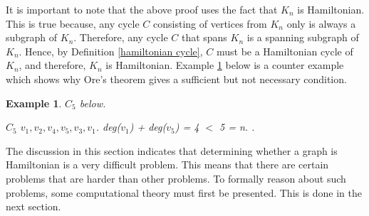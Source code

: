 \documentclass[12pt]{article}
\newtheorem{example}[definition]{Example}
\numberwithin{equation}{subsection}
\numberwithin{table}{subsection}
\numberwithin{algorithm}{subsection}
\begin{document}
It is important to note that the above proof uses the fact that $K_n$ is Hamiltonian. This is true because, any cycle $C$ consisting of vertices from $K_n$ only is always a subgraph of $K_n$. Therefore, any cycle $C$ that spans $K_n$ is a spanning subgraph of $K_n$. Hence, by Definition \ref{hamiltonian cycle}, $C$ must be a Hamiltonian cycle of $K_n$, and therefore, $K_n$ is Hamiltonian. Example \ref{example 6} below is a counter example which shows why Ore's theorem gives a sufficient but not necessary condition.\\
\begin{example}
\label{example 6}
{} $C_5$ below.
\\
\begin{center}
\end{center}
$C_5$ {} $v_1, v_2, v_4, v_5, v_3, v_1$. {} deg($v_1$) + deg($v_5$) = 4 $<$ 5 = n. {}.
\end{example} 
The discussion in this section indicates that determining whether a graph is Hamiltonian is a very difficult problem. This means that there are certain problems that are harder than other problems. To formally reason about such problems, some computational theory must first be presented. This is done in the next section.
\end{document}
